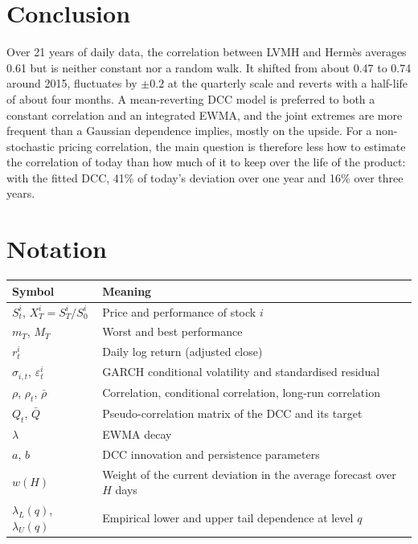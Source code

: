 \documentclass[11pt,a4paper]{article}
\begin{document}
\section{Conclusion}\label{sec:conclusion}
Over 21 years of daily data, the correlation between LVMH and Hermès averages 0.61 but is neither constant nor a
random walk. It shifted from about 0.47 to 0.74 around 2015, fluctuates by $\pm 0.2$ at the quarterly scale and
reverts with a half-life of about four months. A mean-reverting DCC model is preferred to both a constant correlation
and an integrated EWMA, and the joint extremes are more frequent than a Gaussian dependence implies, mostly on the
upside. For a non-stochastic pricing correlation, the main question is therefore less how to estimate the
correlation of today than how much of it to keep over the life of the product: with the fitted DCC, 41\% of today's
deviation over one year and 16\% over three years.

\appendix
\section{Notation}
\begin{center}
\begin{tabular}{@{}ll@{}}
\toprule
Symbol & Meaning \\
\midrule
$S^i_t$, $X^i_T = S^i_T / S^i_0$ & Price and performance of stock $i$ \\
$m_T$, $M_T$ & Worst and best performance \\
$r^i_t$ & Daily log return (adjusted close) \\
$\sigma_{i,t}$, $\varepsilon^i_t$ & GARCH conditional volatility and standardised residual \\
$\rho$, $\rho_t$, $\bar\rho$ & Correlation, conditional correlation, long-run correlation \\
$Q_t$, $\bar Q$ & Pseudo-correlation matrix of the DCC and its target \\
$\lambda$ & EWMA decay \\
$a$, $b$ & DCC innovation and persistence parameters \\
$w(H)$ & Weight of the current deviation in the average forecast over $H$ days \\
$\lambda_L(q)$, $\lambda_U(q)$ & Empirical lower and upper tail dependence at level $q$ \\
\bottomrule
\end{tabular}
\end{center}
\end{document}

